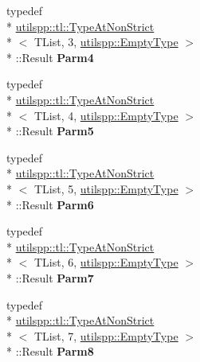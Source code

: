 \begin{DoxyCompactItemize}
\item 
\hypertarget{classutilspp_1_1Functor_a56d44a1be8a03de2f036a9b198558d77}{typedef \\*
\hyperlink{structutilspp_1_1tl_1_1TypeAtNonStrict}{utilspp\-::tl\-::\-Type\-At\-Non\-Strict}\\*
$<$ T\-List, 3, \hyperlink{structutilspp_1_1EmptyType}{utilspp\-::\-Empty\-Type} $>$\\*
\-::Result {\bfseries Parm4}}\label{classutilspp_1_1Functor_a56d44a1be8a03de2f036a9b198558d77}

\item 
\hypertarget{classutilspp_1_1Functor_a91709579a2ecef614a365cb7210caf94}{typedef \\*
\hyperlink{structutilspp_1_1tl_1_1TypeAtNonStrict}{utilspp\-::tl\-::\-Type\-At\-Non\-Strict}\\*
$<$ T\-List, 4, \hyperlink{structutilspp_1_1EmptyType}{utilspp\-::\-Empty\-Type} $>$\\*
\-::Result {\bfseries Parm5}}\label{classutilspp_1_1Functor_a91709579a2ecef614a365cb7210caf94}

\item 
\hypertarget{classutilspp_1_1Functor_a501aab6ad009739cdc17bd74ef839211}{typedef \\*
\hyperlink{structutilspp_1_1tl_1_1TypeAtNonStrict}{utilspp\-::tl\-::\-Type\-At\-Non\-Strict}\\*
$<$ T\-List, 5, \hyperlink{structutilspp_1_1EmptyType}{utilspp\-::\-Empty\-Type} $>$\\*
\-::Result {\bfseries Parm6}}\label{classutilspp_1_1Functor_a501aab6ad009739cdc17bd74ef839211}

\item 
\hypertarget{classutilspp_1_1Functor_a3b37dab0a8dccad781846fe9db72fdb1}{typedef \\*
\hyperlink{structutilspp_1_1tl_1_1TypeAtNonStrict}{utilspp\-::tl\-::\-Type\-At\-Non\-Strict}\\*
$<$ T\-List, 6, \hyperlink{structutilspp_1_1EmptyType}{utilspp\-::\-Empty\-Type} $>$\\*
\-::Result {\bfseries Parm7}}\label{classutilspp_1_1Functor_a3b37dab0a8dccad781846fe9db72fdb1}

\item 
\hypertarget{classutilspp_1_1Functor_aca03cd1997d5d15e1badd6dd1b661c75}{typedef \\*
\hyperlink{structutilspp_1_1tl_1_1TypeAtNonStrict}{utilspp\-::tl\-::\-Type\-At\-Non\-Strict}\\*
$<$ T\-List, 7, \hyperlink{structutilspp_1_1EmptyType}{utilspp\-::\-Empty\-Type} $>$\\*
\-::Result {\bfseries Parm8}}\label{classutilspp_1_1Functor_aca03cd1997d5d15e1badd6dd1b661c75}


\end{DoxyCompactItemize}
